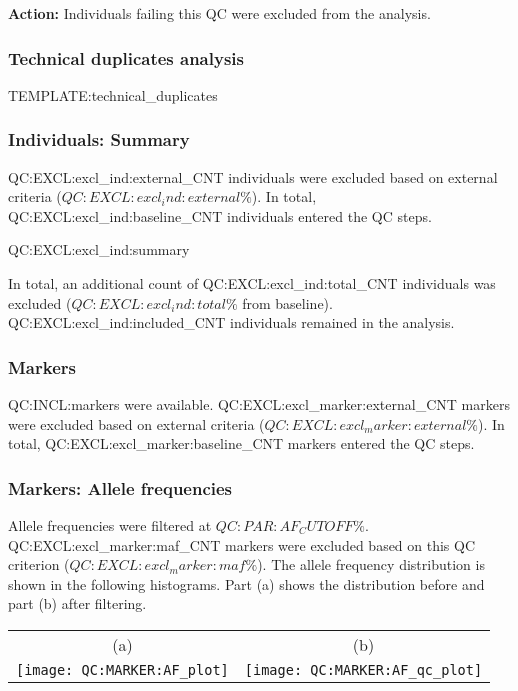 {\bf Action:} Individuals failing this QC were excluded from the analysis.

\subsubsection{Technical duplicates analysis}

TEMPLATE:technical_duplicates

\subsubsection{Individuals: Summary}

QC:EXCL:excl_ind:external_CNT individuals were excluded based on external criteria ($QC:EXCL:excl_ind:external\%$). In total, QC:EXCL:excl_ind:baseline_CNT individuals entered the QC steps. 

QC:EXCL:excl_ind:summary

In total, an additional count of QC:EXCL:excl_ind:total_CNT individuals was excluded ($QC:EXCL:excl_ind:total\%$ from baseline).  QC:EXCL:excl_ind:included_CNT individuals remained in the analysis.


\subsubsection{Markers}

QC:INCL:markers were available. QC:EXCL:excl_marker:external_CNT markers were excluded based on external criteria ($QC:EXCL:excl_marker:external\%$). In total, QC:EXCL:excl_marker:baseline_CNT markers entered the QC steps. 

\subsubsection{Markers: Allele frequencies}

Allele frequencies were filtered at $QC:PAR:AF_CUTOFF\%$. QC:EXCL:excl_marker:maf_CNT markers were excluded based on this QC criterion ($QC:EXCL:excl_marker:maf\%$). The allele frequency distribution is shown in the following histograms. Part (a) shows the distribution before and part (b) after filtering.

\begin{center}
	\begin{tabular}{cc}
		(a) & (b)\\
		\texttt{[image: QC:MARKER:AF\_plot]}
		&
		\texttt{[image: QC:MARKER:AF\_qc\_plot]}
	\end{tabular}
\end{center}

